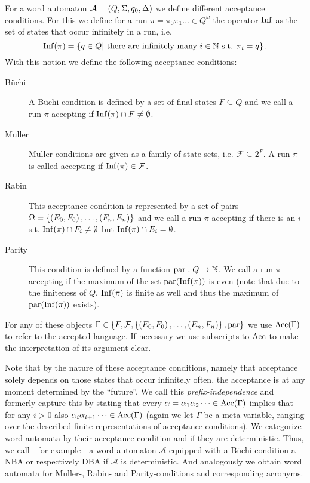 \begin{definition}
  For a word automaton $\mathcal{A} = \left(Q, \Sigma, q_{0}, \Delta\right)$ we
  define different acceptance conditions. For this we define for a run
  $\pi = \pi_{0}\pi_{1}\dots\in Q^{\omega}$ the operator
  $\operatorname{Inf}$ as the set of states that occur infinitely in a run, i.e.
  \begin{equation*}
    \operatorname{Inf}(\pi) = \left\{q\in Q\middle| \text{ there are infinitely many }
    i\in\mathbb{N} \text{ s.t. } \pi_{i} = q\right\}.
  \end{equation*}
  With this notion we define the following acceptance conditions:
  \begin{description}
    \item [Büchi] A Büchi-condition is defined by a set of final states
      $F\subseteq Q$ and we call a run $\pi$ accepting if
      $\operatorname{Inf}(\pi)\cap F\neq\emptyset$.
    \item [Muller] Muller-conditions are given as a family of state sets, i.e.
      $\mathcal{F}\subseteq 2^{F}$. A run $\pi$ is called accepting if
      $\operatorname{Inf}(\pi)\in\mathcal{F}$.
    \item [Rabin] This acceptance condition is represented by a set of pairs\\
      $\Omega = \left\{\left(E_{0}, F_{0}\right), \dots, \left(F_{n}, E_{n}\right)\right\}$ and we
      call a run $\pi$ accepting if there is an $i$ s.t.
      $\operatorname{Inf}(\pi)\cap F_{i}\neq\emptyset$ but $\operatorname{Inf}(\pi)\cap E_{i} = \emptyset$.
    \item [Parity] This condition is defined by a function
      $\operatorname{par}:Q\rightarrow \mathbb{N}$. We call a run $\pi$ accepting if the
      maximum of the set $\operatorname{par}(\operatorname{Inf}(\pi))$ is even (note that due to the 
      finiteness of $Q$, $\operatorname{Inf}(\pi)$ is finite as well and thus the maximum of 
      $\operatorname{par}(\operatorname{Inf}(\pi))$ exists).
  \end{description}
  For any of these objects $\Gamma\in\left\{F, \mathcal{F}, \left\{\left(E_{0},
  F_{0}\right),\dots,\left(E_{n}, F_{n}\right)\right\}, \operatorname{par}\right\}$ we use $\operatorname{Acc}(\Gamma)$ to refer
  to the accepted language. If necessary we use subscripts to $\operatorname{Acc}$ to make 
  the interpretation of its argument clear.
\end{definition}
Note that by the nature of these acceptance conditions, namely that acceptance
solely depends on those states that occur infinitely often, the acceptance is
at any moment determined by the \enquote{future}. We call this
\emph{prefix-independence} and formerly capture this by stating that every
$\alpha = \alpha_{1}\alpha_{2}\dots\in\operatorname{Acc}(\Gamma)$ implies that for any $i>0$
also $\alpha_{i}\alpha_{i+1}\dots\in\operatorname{Acc}(\Gamma)$ (again we let $\Gamma$ be a
meta variable, ranging over the described finite representations of acceptance
conditions). We categorize word automata by their acceptance condition and if
they are deterministic. Thus, we call - for example - a word automaton
$\mathcal{A}$ equipped with a Büchi-condition a \ac{NBA} or respectively
\ac{DBA} if $\mathcal{A}$ is deterministic. And analogously we obtain word
automata for Muller-, Rabin- and Parity-conditions and corresponding
acronyms. 

